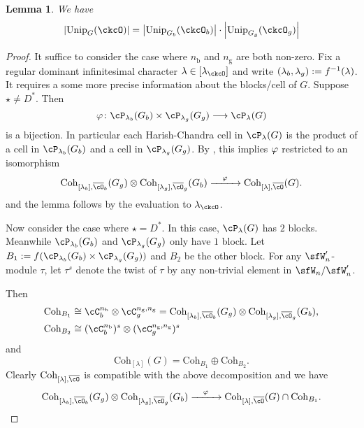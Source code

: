 \documentclass[12pt,a4paper]{amsart}
\def\abs#1{\left|{#1}\right|}
\numberwithin{equation}{section}
\newtheorem{lem}[thm]{Lemma}
\theoremstyle{remark}
\def\Unip{\mathrm{Unip}}
\def\lamck{\lambda_\ckcO}
\def\nbb{n_{\mathrm b}}
\def\ngg{n_{\mathrm g}}
\def\Coh{\mathrm{Coh}}
\begin{document}
\begin{lem}\label{lem:BGcount}
  We have
  \[
    \abs{\Unip_{G}(\ckcO)} =
    \abs{\Unip_{G_{b}}(\ckcO_{b})}\cdot
    \abs{\Unip_{G_{g}}(\ckcO_{g})}
  \]
\end{lem}
\begin{proof}
  It suffice to consider the case where $\nbb$ and $\ngg$ are both non-zero.
  Fix a regular dominant infinitesimal character $\lambda\in [\lamck]$ and write
  $(\lambda_{b},\lambda_{g}):=f^{-1}(\lambda)$. It requires a some more
  precise information about the blocks/cell of $G$. Suppose $\star \neq D^{*}$.
  Then
  \[
    \ffcoh \colon \cP_{\lambda_{b}}(G_{b})\times \cP_{\lambda_{g}}(G_{g}) \longrightarrow \cP_{\lambda}(G)
  \]
  is a bijection. In particular each Harish-Chandra cell in $\cP_{\lambda}(G)$
  is the product of a cell in $\cP_{\lambda_{b}}(G_{b})$ and a cell in
  $\cP_{\lambda_{g}}(G_{g})$. By , this implies $\varphi$
  restricted to an isomorphism
  \[
    \Coh_{[\lambda_{b}],\bcO_{b}}(G_{g})\otimes \Coh_{[\lambda_{g}],\bcO_{g}}(G_{b}) \xrightarrow{\ \ \ \ffcoh\ \ \ } \Coh_{[\lambda],\bcO}(G).
  \]
  and the lemma follows by the evaluation to $\lamck$.

  Now consider the case where $\star = D^{*}$. In this case, $\cP_{\lambda}(G)$
  has $2$ blocks. Meanwhile $\cP_{\lambda_{b}}(G_{b})$ and
  $\cP_{\lambda_{g}}(G_{g})$ only have $1$ block. Let
  $B_{1} := \ff(\cP_{\lambda_{b}}(G_{b})\times \cP_{\lambda_{g}}(G_{g}))$ and
  $B_{2}$ be the other block. For any $\sfW'_{n}$-module $\tau$, let $\tau^{s}$
  denote the twist of $\tau$ by any non-trivial element in $\sfW_{n}/\sfW'_{n}$.

  Then \[
    \begin{split}
      \Coh_{B_{1}} &\cong \cC_{b}^{\nbb}\otimes \cC_{g}^{\ngg,\ngg} = \Coh_{[\lambda_{b}],\bcO_{b}}(G_{g})\otimes \Coh_{[\lambda_{g}],\bcO_{g}}(G_{b}),\\
      \Coh_{B_{2}} &\cong (\cC_{b}^{\nbb})^{s}\otimes (\cC_{g}^{\ngg,\ngg})^{s}
    \end{split}
  \]
   and
  \[
    \Coh_{[\lambda]}(G) = \Coh_{B_{1}}\oplus \Coh_{B_{2}}.
  \]
  Clearly $\Coh_{[\lambda], \bcO}$ is compatible with the above decomposition
  and we have
  \[
    \Coh_{[\lambda_{b}],\bcO_{b}}(G_{g})\otimes \Coh_{[\lambda_{g}],\bcO_{g}}(G_{b}) \xrightarrow{\ \ \ \ffcoh\ \ \ } \Coh_{[\lambda],\bcO}(G)\cap \Coh_{B_{1}}.
  \]


\end{proof}
\end{document}
